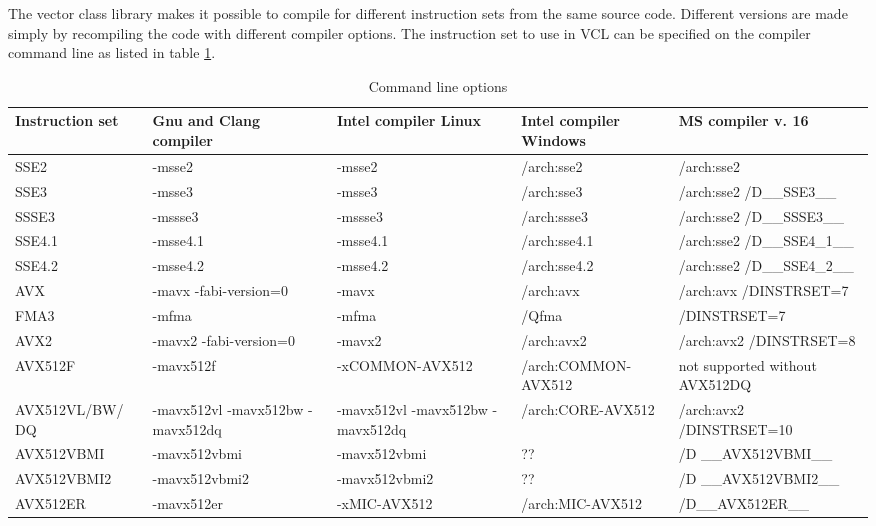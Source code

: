 \documentclass[vcl_manual.tex]{subfiles}
\begin{document}
The vector class library makes it possible to compile for different instruction sets from the same source code. Different versions are made simply by recompiling the code with different compiler options. The instruction set to use in VCL can be specified on the compiler command line as listed in table \ref{table:CommandLineOptions}.

\begin {table}[h]
\caption{Command line options}
\label{table:CommandLineOptions}
\begin{tabular}{|p{26mm}|p{28mm}|p{28mm}|p{28mm}|p{28mm}|}
\hline
\bfseries Instruction set & \bfseries Gnu and Clang compiler & \bfseries Intel compiler Linux & \bfseries Intel compiler Windows & \bfseries MS compiler v. 16\\ \hline

SSE2 & -msse2 & -msse2 & /arch:sse2 & /arch:sse2 \\ \hline
SSE3 & -msse3 & -msse3 & /arch:sse3 & /arch:sse2 \newline /D\_\_SSE3\_\_ \\ \hline
SSSE3 & -mssse3 & -mssse3 & /arch:ssse3 & /arch:sse2 \newline /D\_\_SSSE3\_\_ \\ \hline
SSE4.1 & -msse4.1 & -msse4.1 & /arch:sse4.1 & /arch:sse2 \newline /D\_\_SSE4\_1\_\_ \\ \hline
SSE4.2 & -msse4.2 & -msse4.2 & /arch:sse4.2 & /arch:sse2 \newline /D\_\_SSE4\_2\_\_ \\ \hline
AVX & -mavx \newline -fabi-version=0 & -mavx & /arch:avx & /arch:avx /DINSTRSET=7 \\ \hline
FMA3 & -mfma & -mfma & /Qfma & /DINSTRSET=7 \\ \hline
AVX2 & -mavx2 \newline -fabi-version=0 & -mavx2 & /arch:avx2 & /arch:avx2 \newline /DINSTRSET=8 \\ \hline
AVX512F & -mavx512f & -xCOMMON-AVX512 & /arch:COMMON-AVX512 & not supported without AVX512DQ\\ \hline

AVX512VL/BW/ DQ & -mavx512vl -mavx512bw -mavx512dq & -mavx512vl -mavx512bw -mavx512dq & /arch:CORE-AVX512 & /arch:avx2 /DINSTRSET=10 \\ \hline
AVX512VBMI & -mavx512vbmi & -mavx512vbmi & ?? & /D \_\_AVX512VBMI\_\_ \\ \hline
AVX512VBMI2 & -mavx512vbmi2 & -mavx512vbmi2 & ?? & /D \_\_AVX512VBMI2\_\_ \\ \hline
AVX512ER & -mavx512er & -xMIC-AVX512 & /arch:MIC-AVX512 & /D\_\_AVX512ER\_\_ \\ \hline

\end{tabular}
\end{table}
\end{document}
